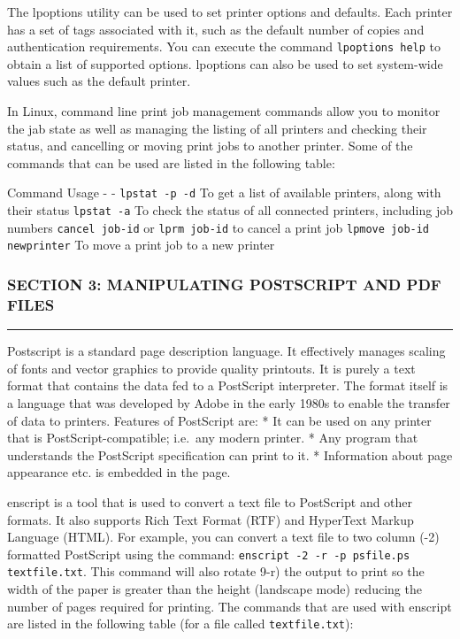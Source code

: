 The lpoptions utility can be used to set printer options and defaults.
Each printer has a set of tags associated with it, such as the default
number of copies and authentication requirements. You can execute the
command \texttt{lpoptions help} to obtain a list of supported options.
lpoptions can also be used to set system-wide values such as the default
printer.

In Linux, command line print job management commands allow you to
monitor the jab state as well as managing the listing of all printers
and checking their status, and cancelling or moving print jobs to
another printer. Some of the commands that can be used are listed in the
following table:

Command \textbar{} Usage - \textbar{} - \texttt{lpstat -p -d} \textbar{}
To get a list of available printers, along with their status
\texttt{lpstat -a} \textbar{} To check the status of all connected
printers, including job numbers \texttt{cancel job-id} \n or
\n \texttt{lprm job-id} \textbar{} to cancel a print job
\texttt{lpmove job-id newprinter} \textbar{} To move a print job to a
new printer

\subsubsection{SECTION 3: MANIPULATING POSTSCRIPT AND PDF
FILES}\label{section-3-manipulating-postscript-and-pdf-files}

\begin{center}\rule{3in}{0.4pt}\end{center}

Postscript is a standard page description language. It effectively
manages scaling of fonts and vector graphics to provide quality
printouts. It is purely a text format that contains the data fed to a
PostScript interpreter. The format itself is a language that was
developed by Adobe in the early 1980s to enable the transfer of data to
printers. Features of PostScript are: * It can be used on any printer
that is PostScript-compatible; i.e.~any modern printer. * Any program
that understands the PostScript specification can print to it. *
Information about page appearance etc. is embedded in the page.

enscript is a tool that is used to convert a text file to PostScript and
other formats. It also supports Rich Text Format (RTF) and HyperText
Markup Language (HTML). For example, you can convert a text file to two
column (-2) formatted PostScript using the command:
\texttt{enscript -2 -r -p psfile.ps textfile.txt}. This command will
also rotate 9-r) the output to print so the width of the paper is
greater than the height (landscape mode) reducing the number of pages
required for printing. The commands that are used with enscript are
listed in the following table (for a file called \texttt{textfile.txt}):

